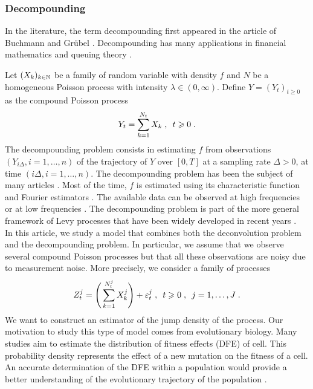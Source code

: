 \subsubsection*{Decompounding} In the literature, the term decompounding first appeared in the article of Buchmann and Grübel \cite{buchmann2003decompounding}. 
 Decompounding has many applications in financial mathematics \cite{embrechts2013modelling} and queuing theory \cite{babai2011analysis, gomez2016retrial}. 

Let $(X_k)_{k \in \mathbb{N}}$ be a family of \iid random variable with density $f$ and $N$ be a homogeneous Poisson process with intensity $\lambda \in (0, \infty)$. Define $Y = (Y_t)_{t \geq 0}$ as the compound Poisson process
    \begin{equation*}
        Y_t
        = \sum^{N_t}_{k = 1}X_k
        \; , \enspace
        t \geqslant 0
        \; .
    \end{equation*}
The decompounding problem consists in estimating $f$ from observations $(Y_{i\Delta}, i=1,\ldots,n)$ of the trajectory of $Y$ over $[0, T]$ at a sampling rate $\Delta > 0$, \ie  at time $(i\Delta,i=1,\ldots,n)$. 
The decompounding problem has been the subject of many articles \cite{bogsted2010decompounding, buchmann2004decompounding, van2004asymptotic}. Most of the time, $f$  is estimated using its characteristic function and Fourier estimators \cite{duval2019adaptive}.  The available data can be observed at high frequencies or at low frequencies \cite{duval2019adaptive, coca2018efficient}. 
The decompounding problem is part of the more general framework of Levy processes that have been widely developed in recent years \cite{reiss2013testing, nickl2012donsker, applebaum2009levy}.
\\

In this article, we study a model that combines both the deconvolution problem and the decompounding problem. In particular, we assume that we observe several compound Poisson processes but that all these observations are noisy due to measurement noise. More precisely, we consider a family of processes
    \begin{equation*}
        Z^j_t = \Bigg( \sum^{N_t^j}_{k = 1}X_k^j \Bigg) + \varepsilon^j_t
        \; , \enspace
        t \geqslant 0
        \; , \enspace
        j = 1,\ldots,J
        \; .
    \end{equation*}
We want to construct an estimator of the jump density of the process. Our motivation to study this type of model comes from evolutionary biology.  Many studies aim to estimate the distribution of fitness effects (DFE) of cell. This probability density represents the effect of a new mutation on the fitness of a cell. An accurate determination of the DFE within a population would provide a better understanding of the evolutionary trajectory of the population \cite{eyre2007distribution}.\\

